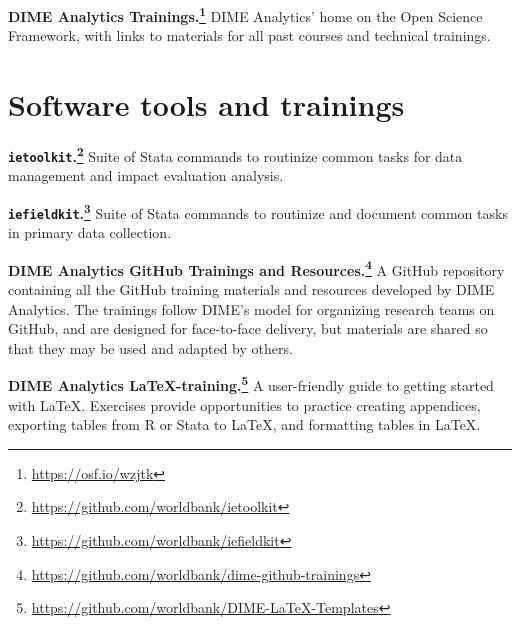 \resourcepar\textbf{DIME Analytics Trainings.\footnote{
		\url{https://osf.io/wzjtk}}}
DIME Analytics' home on the Open Science Framework,
with links to materials for all past courses and technical trainings.


\section{Software tools and trainings}

\textbf{\texttt{ietoolkit}.\footnote{
		\url{https://github.com/worldbank/ietoolkit}}}
Suite of Stata commands to routinize common tasks for
data management and impact evaluation analysis.

\resourcepar\textbf{\texttt{iefieldkit}.\footnote{
		\url{https://github.com/worldbank/iefieldkit}}}
Suite of Stata commands to routinize 
and document common tasks in primary data collection.

\resourcepar\textbf{DIME Analytics GitHub Trainings and Resources.\footnote{
		\url{https://github.com/worldbank/dime-github-trainings}}}
A GitHub repository containing all
the GitHub training materials and resources developed by DIME Analytics.
The trainings follow DIME's model for organizing research teams on GitHub,
and are designed for face-to-face delivery,
but materials are shared so that they may be used and adapted by others.

\resourcepar\textbf{DIME Analytics \LaTeX-training.\footnote{
		\url{https://github.com/worldbank/DIME-LaTeX-Templates}}}
A user-friendly guide to getting started with LaTeX.
Exercises provide opportunities to
practice creating appendices,
exporting tables from R or Stata to LaTeX,
and formatting tables in LaTeX.


\mainmatter
